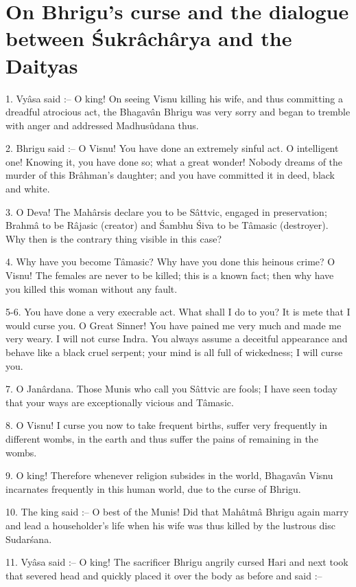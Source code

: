 ﻿\chapter{On Bhrigu's curse and the dialogue between \'Sukr\^ach\^arya and the Daityas}

1. Vy\^asa said :-- O king! On seeing Visnu killing his wife, and thus committing a dreadful atrocious act, the Bhagav\^an Bhrigu was very sorry and began to tremble with anger and addressed Madhusûdana thus.

2. Bhrigu said :-- O Visnu! You have done an extremely sinful act. O intelligent one! Knowing it, you have done so; what a great wonder! Nobody dreams of the murder of this Br\^ahman's daughter; and you have committed it in deed, black and white.

3. O Deva! The Mah\^arsis declare you to be S\^attvic, engaged in preservation; Brahm\^a to be R\^ajasic (creator) and \'Sambhu \'Siva to be T\^amasic (destroyer). Why then is the contrary thing visible in this case?

4. Why have you become T\^amasic? Why have you done this heinous crime? O Visnu! The females are never to be killed; this is a known fact; then why have you killed this woman without any fault.

5-6. You have done a very execrable act. What shall I do to you? It is mete that I would curse you. O Great Sinner! You have pained me very much and made me very weary. I will not curse Indra. You always assume a deceitful appearance and behave like a black cruel serpent; your mind is all full of wickedness; I will curse you.

7. O Jan\^ardana. Those Munis who call you S\^attvic are fools; I have seen today that your ways are exceptionally vicious and T\^amasic.

8. O Visnu! I curse you now to take frequent births, suffer very frequently in different wombs, in the earth and thus suffer the pains of remaining in the wombs.

9. O king! Therefore whenever religion subsides in the world, Bhagav\^an Visnu incarnates frequently in this human world, due to the curse of Bhrigu.

10. The king said :-- O best of the Munis! Did that Mah\^atm\^a Bhrigu again marry and lead a householder's life when his wife was thus killed by the lustrous disc Sudar\'sana.

11. Vy\^asa said :-- O king! The sacrificer Bhrigu angrily cursed Hari and next took that severed head and quickly placed it over the body as before and said :--

